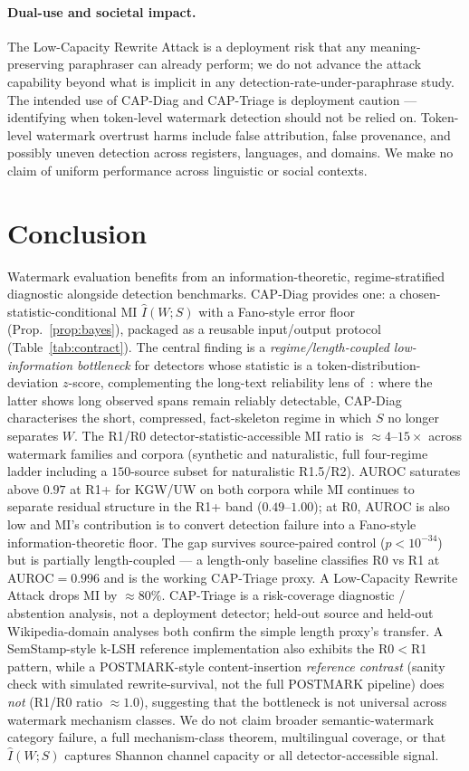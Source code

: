 \documentclass[11pt]{article}
\begin{document}
\paragraph{Dual-use and societal impact.}
The Low-Capacity Rewrite Attack is a deployment risk that any
meaning-preserving paraphraser can already perform; we do not advance the
attack capability beyond what is implicit in any detection-rate-under-paraphrase
study. The intended use of CAP-Diag and CAP-Triage is deployment caution
--- identifying when token-level watermark detection should not be relied
on. Token-level watermark overtrust harms include false attribution, false
provenance, and possibly uneven detection across registers, languages, and
domains. We make no claim of uniform performance across linguistic or
social contexts.

\section{Conclusion}
Watermark evaluation benefits from an information-theoretic,
regime-stratified diagnostic alongside detection benchmarks. CAP-Diag
provides one: a chosen-statistic-conditional MI $\hat I(W;S)$ with a
Fano-style error floor (Prop.~\ref{prop:bayes}), packaged as a reusable
input/output protocol (Table~\ref{tab:contract}). The central finding is
a \emph{regime/length-coupled low-information bottleneck} for detectors
whose statistic is a token-distribution-deviation $z$-score, complementing
the long-text reliability lens of~\citet{kirchenbauer2024reliability}:
where the latter shows long observed spans remain reliably detectable,
CAP-Diag characterises the short, compressed, fact-skeleton regime in
which $S$ no longer separates $W$.
The R1/R0 detector-statistic-accessible MI ratio is $\approx 4$--$15\times$
across watermark families and corpora (synthetic and naturalistic, full
four-regime ladder including a $150$-source subset for naturalistic
R1.5/R2). AUROC saturates above $0.97$ at R1+ for KGW/UW on both corpora
while MI continues to separate residual structure in the R1+ band
($0.49$--$1.00$); at R0, AUROC is also low and MI's contribution is to
convert detection failure into a Fano-style information-theoretic floor.
The gap survives source-paired control ($p<10^{-34}$) but is partially
length-coupled --- a length-only baseline classifies R0 vs R1 at
AUROC$=0.996$ and is the working CAP-Triage proxy. A Low-Capacity Rewrite
Attack drops MI by $\approx 80\%$. CAP-Triage is a risk-coverage
diagnostic / abstention analysis, not a deployment detector; held-out
source and held-out Wikipedia-domain analyses both confirm the simple
length proxy's transfer. A SemStamp-style k-LSH reference implementation
also exhibits the R0$<$R1 pattern, while a POSTMARK-style content-insertion
\emph{reference contrast} (sanity check with simulated rewrite-survival,
not the full POSTMARK pipeline) does \emph{not} (R1/R0 ratio
$\approx 1.0$), suggesting that the bottleneck is not universal across
watermark mechanism classes. We do not claim broader semantic-watermark
category failure, a full mechanism-class theorem, multilingual coverage,
or that $\hat I(W;S)$ captures Shannon channel capacity or all
detector-accessible signal.
\end{document}
